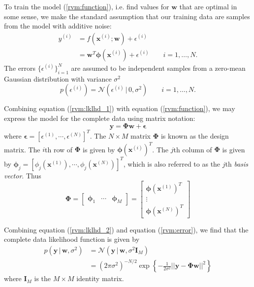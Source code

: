 To train the model (\ref{rvm:function}), i.e. find values for $\bm w$ that are optimal in some sense, we make the standard assumption that our training data are samples from the model with additive noise:
\begin{equation}
  \label{rvm:lklhd_1}
  \begin{split}
    y^{(i)} &= f(\bm x^{(i)}; \bm w) + \epsilon^{(i)}\\
    &= \bm w^T \bm \phi(\bm x^{(i)}) + \epsilon^{(i)}\qquad i = 1, \dots, N.
  \end{split}
\end{equation}
The errors $\{\epsilon^{(i)}\}_{i=1}^N$ are assumed to be independent samples from a zero-mean Gaussian distribution with variance $\sigma^2$
\begin{equation}
  \label{rvm:error}
  p(\epsilon^{(i)}) = \mathcal{N}(\epsilon^{(i)}\,|\,0, \sigma^2)\qquad i = 1, \dots, N.
\end{equation}

Combining equation (\ref{rvm:lklhd_1}) with equation (\ref{rvm:function}), we may express the model for the complete data using matrix notation:
\begin{equation}
  \label{rvm:lklhd_2}
  \bm y = \bm\Phi \bm w + \bm \epsilon
\end{equation}
where $\bm \epsilon = \left[\epsilon^{(1)}, \cdots, \epsilon^{(N)}\right]^T$.
The $N\times M$ matrix $\bm \Phi$ is known as the design matrix. 
The $i$th row of $\bm \Phi$ is given by $\bm \phi(\bm x^{(i)})^T$.
The $j$th column of $\bm \Phi$ is given by $\bm \phi_j = \left[\phi_j\left(\bm x^{(1)}\right), \cdots, \phi_j\left(\bm x^{(N)}\right)\right]^T$, which is also referred to as the $j$th \emph{basis vector}.
Thus
\begin{equation*}
  \bm\Phi =
  \begin{bmatrix}
    \bm\phi_1 & \cdots & \bm\phi_M
  \end{bmatrix}
  =
  \begin{bmatrix}
    \bm\phi(\bm x^{(1)})^T\\
    \vdots\\
    \bm\phi(\bm x^{(N)})^T
  \end{bmatrix}
\end{equation*}

Combining equation (\ref{rvm:lklhd_2}) and equation (\ref{rvm:error}), we find that the complete data likelihood function is given by
\begin{equation}
  \label{rvm:complete_lk}
  \begin{split}
    p\left(\bm y\,|\,\bm w,\sigma^2\right) &= \mathcal{N}\left(\bm y\,|\,\bm w,\sigma^2 \bm I_M\right)\\
    &= (2\pi\sigma^2)^{-N/2} \exp\left\{-\frac{1}{2\sigma^2}||\bm y - \bm\Phi\bm w||^2\right\}
  \end{split}
\end{equation}
where $\bm I_M$ is the $M\times M$ identity matrix.

